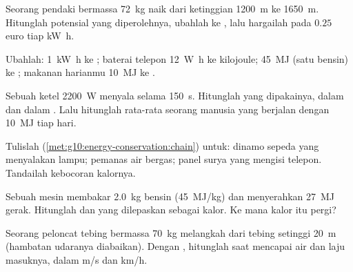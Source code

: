 \begin{exercise}[$\star$]\label{exo:g10:energy-conservation:2}
Seorang pendaki bermassa \qty{72}{kg} naik dari ketinggian
\qty{1200}{m} ke \qty{1650}{m}. Hitunglah  potensial yang
diperolehnya, ubahlah ke , lalu hargailah pada $0.25$ euro
tiap \unit{kW.h}.
\end{exercise}

\begin{exercise}[$\star$]\label{exo:g10:energy-conservation:3}
Ubahlah: \qty{1}{kW.h} ke ; baterai telepon \qty{12}{W.h} ke
kilojoule; \qty{45}{MJ} (satu  bensin) ke ;
makanan harianmu \qty{10}{MJ} ke .
\end{exercise}

\begin{exercise}[$\star$]\label{exo:g10:energy-conservation:4}
Sebuah ketel \qty{2200}{W} menyala selama \qty{150}{s}. Hitunglah
 yang dipakainya, dalam  dan dalam . Lalu
hitunglah  rata-rata seorang manusia yang berjalan dengan
\qty{10}{MJ} tiap hari.
\end{exercise}

\begin{exercise}[$\star$]\label{exo:g10:energy-conservation:5}
Tulislah 
(\cref{met:g10:energy-conservation:chain}) untuk: dinamo sepeda yang
menyalakan lampu; pemanas air bergas; panel surya yang mengisi telepon.
Tandailah kebocoran kalornya.
\end{exercise}

\begin{exercise}[$\star\star$]\label{exo:g10:energy-conservation:6}
Sebuah mesin membakar \qty{2.0}{kg} bensin (\qty{45}{MJ/kg}) dan
menyerahkan \qty{27}{MJ} gerak. Hitunglah  dan  yang
dilepaskan sebagai kalor. Ke mana kalor itu pergi?
\end{exercise}

\begin{exercise}[$\star\star$]\label{exo:g10:energy-conservation:7}
Seorang peloncat tebing bermassa \qty{70}{kg} melangkah dari tebing
setinggi \qty{20}{m} (hambatan udaranya diabaikan). Dengan , hitunglah  saat mencapai air dan laju
masuknya, dalam \unit{m/s} dan \unit{km/h}.
\end{exercise}

